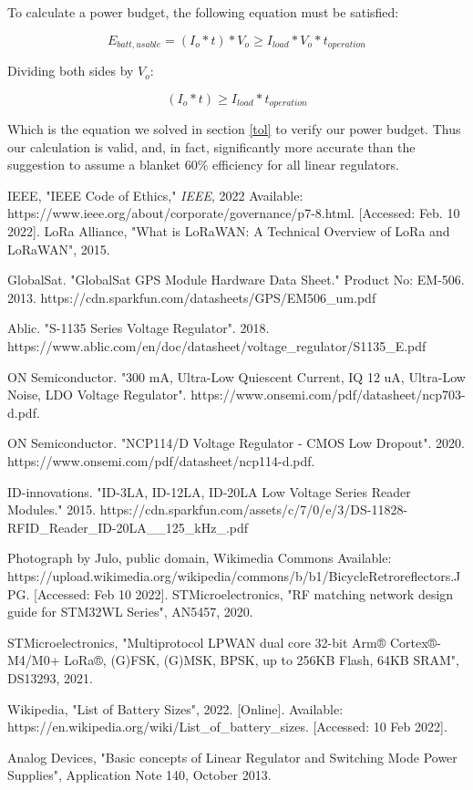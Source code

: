 \documentclass{article}
\begin{document}
To calculate a power budget, the following equation must be satisfied: 

$$
E_{batt, usable} = (I_o*t)*V_o \geq I_{load}* V_o * t_{operation}
$$

Dividing both sides by $V_o$: 

$$
(I_o*t) \geq I_{load}* t_{operation}
$$


Which is the equation we solved in section \ref{tol} to verify our power budget. Thus our calculation is valid, and, in fact, significantly more accurate than the suggestion to assume a blanket 60\% efficiency for all linear regulators. 



\begin{thebibliography}{}
	 IEEE, "IEEE Code of Ethics," \textit{IEEE}, 2022 Available: https://www.ieee.org/about/corporate/governance/p7-8.html. [Accessed: Feb. 10 2022].
	 LoRa Alliance, "What is LoRaWAN: A Technical Overview of LoRa and LoRaWAN", 2015.
	
	 GlobalSat. "GlobalSat GPS Module Hardware Data Sheet." Product No: EM-506. 2013. https://cdn.sparkfun.com/datasheets/GPS/EM506\_um.pdf
	
	 Ablic. "S-1135 Series Voltage Regulator". 2018. https://www.ablic.com/en/doc/datasheet/voltage\_regulator/S1135\_E.pdf
	
	 ON Semiconductor. "300 mA, Ultra-Low Quiescent
	Current, IQ 12 uA, Ultra-Low Noise, LDO Voltage Regulator". https://www.onsemi.com/pdf/datasheet/ncp703-d.pdf.
	
	 ON Semiconductor. "NCP114/D Voltage Regulator - CMOS Low Dropout". 2020. https://www.onsemi.com/pdf/datasheet/ncp114-d.pdf. 
	
	 ID-innovations. "ID-3LA, ID-12LA, ID-20LA Low Voltage Series Reader Modules." 2015. https://cdn.sparkfun.com/assets/c/7/0/e/3/DS-11828-RFID\_Reader\_ID-20LA\_\_125\_kHz\_.pdf
	
	 Photograph by Julo, public domain, Wikimedia Commons Available: https://upload.wikimedia.org/wikipedia/commons/b/b1/BicycleRetroreflectors.JPG. [Accessed: Feb 10 2022]. 
	 STMicroelectronics, "RF matching network design guide for STM32WL Series", AN5457, 2020. 
	
	 STMicroelectronics, "Multiprotocol LPWAN dual core 32-bit Arm® Cortex®-M4/M0+	LoRa®, (G)FSK, (G)MSK, BPSK, up to 256KB Flash, 64KB SRAM", DS13293, 2021.
	
	
	 Wikipedia, "List of Battery Sizes", 2022. [Online]. Available: https://en.wikipedia.org/wiki/List\_of\_battery\_sizes. [Accessed: 10 Feb 2022]. 
	
	
	 Analog Devices, "Basic concepts of Linear Regulator and Switching Mode Power Supplies", Application Note 140, October 2013. 
\end{thebibliography}
\end{document}
